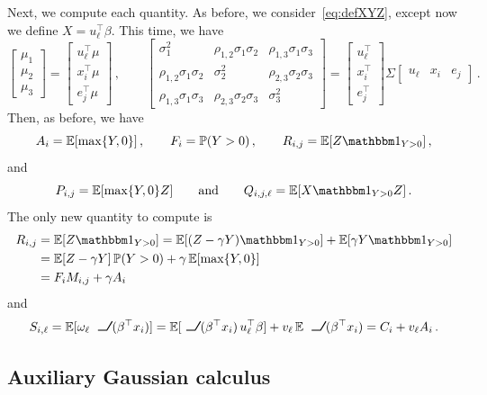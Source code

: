 \documentclass{custom}
\begin{document}
Next, we compute each quantity.
As before, we consider~\eqref{eq:defXYZ}, except now we define $X = u_\ell^\top \beta$.
This time, we have
\[
\begin{bmatrix}
\mu_{1}\\
\mu_{2} \\
\mu_{3}
\end{bmatrix}=\begin{bmatrix}
u_{\ell}^{\top}\mu\\[0.25em]
x_{i}^{\top}\mu\\[0.25em]
e_{j}^{\top}\mu
\end{bmatrix}\,,\qquad \begin{bmatrix}
\sigma_{1}^{2} & \rho_{1,2}\sigma_{1}\sigma_{2} & \rho_{1,3}\sigma_{1}\sigma_{3}\\
\rho_{1,2}\sigma_{1}\sigma_{2} & \sigma_{2}^{2} & \rho_{2,3}\sigma_{2}\sigma_{3}\\
\rho_{1,3}\sigma_{1}\sigma_{3} & \rho_{2,3}\sigma_{2}\sigma_{3} & \sigma_{3}^{2}
\end{bmatrix}=\begin{bmatrix}
u_{\ell}^{\top}\\[0.25em]
x_{i}^{\top}\\[0.25em]
e_{j}^{\top}
\end{bmatrix}\Sigma \begin{bmatrix}
u_{\ell} & x_{i} & e_{j}\end{bmatrix}\,.
\]
Then, as before, we have
\[
A_{i}=\mathbb{E}[\max\{ Y,0\} ]\,,\qquad F_{i}=\mathbb{P}(Y>0)\,,\qquad R_{i,j}=\mathbb{E}[Z\ind_{Y>0}]\,,
\]
and
\[
P_{i,j}=\mathbb{E}[\max\{ Y,0\} Z]\qquad\text{and}\qquad Q_{i,j,\ell}=\mathbb{E}[X\ind_{Y>0}Z]\,.
\]
The only new quantity to compute is
\begin{align*}
R_{i,j} & =\mathbb{E}[Z\ind_{Y>0}]=\mathbb{E}[(Z-\gamma Y)\ind_{Y>0}]+\mathbb{E}[\gamma Y\ind_{Y>0}]\\
 & =\mathbb{E}[Z-\gamma Y]\,\mathbb{P}(Y>0)+\gamma\,\mathbb{E}[\max\{ Y,0\} ]\\
 &= F_i M_{i,j}+\gamma A_{i}
\end{align*}
and
\[
S_{i,\ell}=\mathbb{E}[\omega_{\ell}\ReLU(\beta^\top x_i)]=\mathbb{E}[\ReLU(\beta^\top x_i) \,u_{\ell}^{\top}\beta]+v_{\ell}\,\mathbb{E}\ReLU(\beta^\top x_i)=C_{i}+v_{\ell}A_{i}\,.
\]


\subsection{Auxiliary Gaussian calculus\label{sec:auxiliary}}
\end{document}
